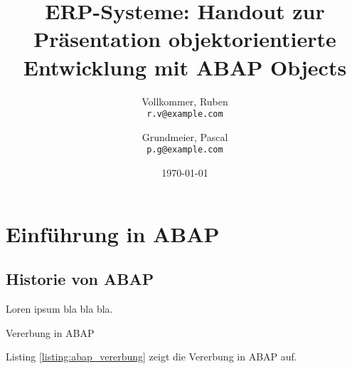 \documentclass[12pt,a4paper]{scrartcl}
\begin{document}
\title{ERP-Systeme: Handout zur Präsentation objektorientierte Entwicklung mit ABAP Objects}

\author{
  Vollkommer, Ruben\\
  \texttt{r.v@example.com}
  \and
  Grundmeier, Pascal\\
  \texttt{p.g@example.com}
}


\date{\today}
\maketitle

\newpage
\tableofcontents

\renewcommand\listoflistingscaption{Liste des enthaltenen Quellcodes}
\listoflistings

\newpage

\section{Einführung in ABAP}
\subsection{Historie von ABAP}
Loren ipsum bla bla bla.
\begin{listing}[ht]{}
  \caption{Vererbung in ABAP}
  \label{listing:abap_vererbung}
\end{listing}
\newline 
Listing \ref{listing:abap_vererbung} zeigt die Vererbung in ABAP auf.
\end{document}
